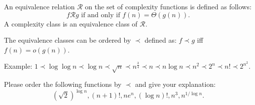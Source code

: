 \documentclass[12pt,a4paper]{article}
\makeatletter
\newtheorem*{solution}{Solution}
\theoremstyle{definition}
\renewenvironment{solution}[1][Solution] {\par\pushQED{\qed}\normalfont\topsep6\p@\@plus6\p@\relax\trivlist\item[\hskip\labelsep\bfseries#1\@addpunct{.}]\ignorespaces}{\popQED\endtrivlist\@endpefalse} \makeatother
\makeatother
\begin{document}
\begin{enumerate}
An equivalence relation $\mathcal{R}$ on the set of complexity functions is defined as follows: $$f\mathcal{R}g \mbox{ if and only if }
f(n)=\Theta(g(n)).$$ A complexity class is an equivalence class of $\mathcal{R}$.

The equivalence classes can be ordered by $\prec$ defined as: $f\prec g$ iff $f(n)=o(g(n))$.

{\color{purple}Example: $1 \prec \log \log n \prec \log n \prec \sqrt{n} \prec n^{\frac{3}{4}} \prec n \prec n \log n \prec n^2 \prec 2^n \prec n! \prec 2^{n^2}$.}

Please order the following functions by $\prec$ and give your explanation: $$(\sqrt{2})^{\log n}, (n+1)!, 
ne^n, (\log n)!, n^3,  n^{1/\log n}.$$





\end{enumerate}

\end{document}
